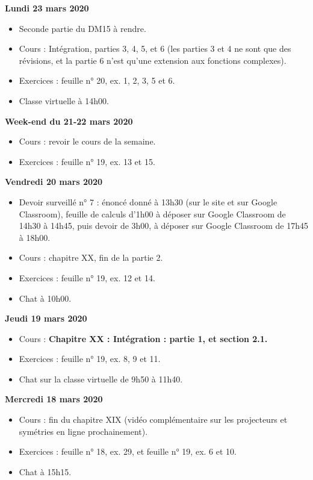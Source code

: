 \documentclass[12pt,a4paper]{article}
\begin{document}
\noindent\textbf{\bf Lundi 23 mars 2020}
\begin{itemize}
\item Seconde partie du DM15 à rendre.
\item Cours : Intégration, parties 3, 4, 5, et 6 (les parties 3 et 4 ne sont que des révisions, et la partie 6 n'est qu'une extension aux fonctions complexes).
\item Exercices : feuille n° 20, ex. 1, 2, 3, 5 et 6.
\item Classe virtuelle à 14h00.\vspace{.4cm}
\end{itemize}

\noindent\textbf{Week-end du 21-22 mars 2020}
\begin{itemize}
\item Cours : revoir le cours de la semaine.
\item Exercices : feuille n° 19, ex. 13 et 15.\vspace{.4cm}
\end{itemize}


\noindent\textbf{\bf Vendredi 20 mars 2020}
\begin{itemize}
\item Devoir surveillé n° 7 : énoncé donné à 13h30 (sur le site et sur Google Classroom), feuille de calculs d'1h00 à déposer sur Google Classroom de 14h30 à 14h45, puis devoir de 3h00, à déposer sur Google Classroom de 17h45 à 18h00.
\item Cours : chapitre XX, fin de la partie 2.
\item Exercices : feuille n° 19, ex. 12 et 14.
\item Chat à 10h00.\vspace{.4cm}
\end{itemize}
 
\noindent\textbf{Jeudi 19 mars 2020}
\begin{itemize}
\item Cours : \bf Chapitre XX \rm : Intégration : partie 1, et section 2.1.
\item Exercices : feuille n° 19, ex. 8, 9 et 11.
\item Chat sur la classe virtuelle de 9h50 à 11h40.\vspace{.4cm}
\end{itemize}

\noindent\textbf{Mercredi 18 mars 2020}
\begin{itemize}
\item Cours : fin du chapitre XIX (vidéo complémentaire sur les projecteurs et symétries en ligne prochainement).
\item Exercices : feuille n° 18, ex. 29, et feuille n° 19, ex. 6 et 10.
\item Chat à 15h15.\vspace{.4cm}
\end{itemize}
\end{document}
